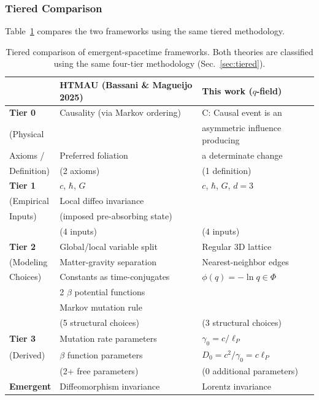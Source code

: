 \documentclass[aps,prd,twocolumn,showpacs,superscriptaddress,preprintnumbers]{revtex4-2}
\begin{document}
\subsubsection{Tiered Comparison}

Table~\ref{tab:compare_htmau} compares the two frameworks using the same tiered methodology.

\begin{table}[h]
\centering
\caption{Tiered comparison of emergent-spacetime frameworks. Both theories are classified using the same four-tier methodology (Sec.~\ref{sec:tiered}).}
\label{tab:compare_htmau}
\begin{tabular}{p{}p{}p{}}
\toprule
& \textbf{HTMAU (Bassani \& Magueijo 2025)} & \textbf{This work ($q$-field)} \\
\midrule
\textbf{Tier 0} & Causality (via Markov ordering) & C: Causal event is an \\
(Physical & & asymmetric influence producing \\
Axioms / & Preferred foliation & a determinate change \\
Definition) & (2 axioms) & (1 definition) \\
\midrule
\textbf{Tier 1} & $c$, $\hbar$, $G$ & $c$, $\hbar$, $G$, $d=3$ \\
(Empirical & Local diffeo invariance & \\
Inputs) & (imposed pre-absorbing state) & \\
& (4 inputs) & (4 inputs) \\
\midrule
\textbf{Tier 2} & Global/local variable split & Regular 3D lattice \\
(Modeling & Matter-gravity separation & Nearest-neighbor edges \\
Choices) & Constants as time-conjugates & $\phi(q)=-\ln q\in\Phi$ \\
& 2 $\beta$ potential functions & \\
& Markov mutation rule & \\
& (5 structural choices) & (3 structural choices) \\
\midrule
\textbf{Tier 3} & Mutation rate parameters & $\gamma_0=c/\ell_P$ \\
(Derived) & $\beta$ function parameters & $D_0=c^2/\gamma_0=c\ell_P$ \\
& (2+ free parameters) & (0 additional parameters) \\
\midrule
\textbf{Emergent} & Diffeomorphism invariance & Lorentz invariance \\

\end{tabular}
\end{table}
\end{document}
